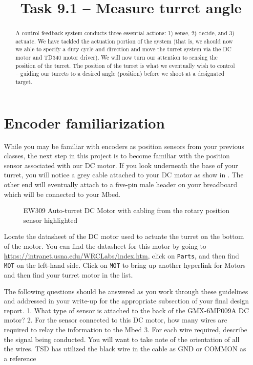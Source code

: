 \documentclass{exam}
\title{\usnaCourseNumber\ Task 9.1 -- Measure turret angle}
\author{\usnaInstructorShort}
\date{\printdate{\courseWeekSeven}}
\begin{document}
\maketitle

\begin{abstract}
A control feedback system conducts three essential actions: 1) sense, 2) decide, and 3) actuate. We have tackled the actuation portion of the system (that is, we should now we able to specify a duty cycle and direction and move the turret system via the DC motor and TD340 motor driver).  We will now turn our attention to sensing the position of the turret.  The position of the turret is what we eventually wish to control – guiding our turrets to a desired angle (position) before we shoot at a designated target.  
\end{abstract}

\section{Encoder familiarization}
While you may be familiar with encoders as position sensors from your previous classes, the next step in this project is to become familiar with the position sensor associated with our DC motor.  If you look underneath the base of your turret, you will notice a grey cable attached to your DC motor as show in . The other end will eventually attach to a five-pin male header on your breadboard which will be connected to your Mbed.
\begin{figure}[h]
\caption{EW309 Auto-turret DC Motor with cabling from the rotary position sensor highlighted}
\label{fig:1}
\end{figure}

Locate the datasheet of the DC motor used to actuate the turret on the bottom of the motor.  You can find the datasheet for this motor by going to \url{https://intranet.usna.edu/WRCLabs/index.htm}, click on \lstinline{Parts}, and then find \lstinline{MOT} on the left-hand side.  Click on \lstinline{MOT} to bring up another hyperlink for Motors and then find your turret motor in the list.  

The following questions should be answered as you work through these guidelines and addressed in your write-up for the appropriate subsection of your final design report.
    1. What type of sensor is attached to the back of the GMX-6MP009A DC motor?
    2. For the sensor connected to this DC motor, how many wires are required to relay the information to the Mbed
    3. For each wire required, describe the signal being conducted.  You will want to take note of the orientation of all the wires.  TSD has utilized the black wire in the cable as GND or COMMON as a reference
    
\end{document}
